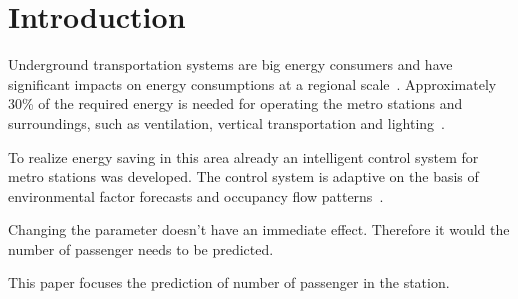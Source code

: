 \section{Introduction}
\label{sec:introduction}

Underground transportation systems are big energy consumers and have significant impacts on energy consumptions at a regional scale~\cite{anderson_maximizing_2009}. Approximately 30\% of the required energy is needed for operating the metro stations and surroundings, such as ventilation, vertical transportation and lighting~\cite{TMB}.

To realize energy saving in this area already an intelligent control system for metro stations was developed. The control system is adaptive on the basis of environmental factor forecasts and occupancy flow patterns~\cite{guo_intelligent_2013}.

Changing the parameter doesn't have an immediate effect. Therefore it would the number of passenger needs to be predicted.

This paper focuses the prediction of number of passenger in the station.

